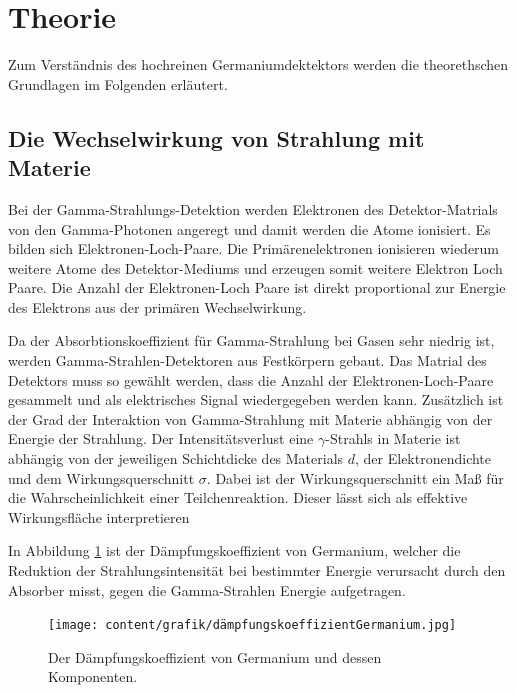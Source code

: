 \section[Theorie]{Theorie \textnormal{\cite{germanium}}}
\label{sec:theorie}

Zum Verständnis des hochreinen Germaniumdektektors werden die theorethschen Grundlagen im Folgenden erläutert.

\subsection{Die Wechselwirkung von Strahlung mit Materie}
\label{sec:WW mit Materie}

Bei der Gamma-Strahlungs-Detektion werden Elektronen des Detektor-Matrials von den Gamma-Photonen angeregt und damit werden die 
Atome ionisiert. Es bilden sich Elektronen-Loch-Paare. Die Primärenelektronen ionisieren wiederum weitere Atome des Detektor-Mediums und erzeugen somit weitere Elektron Loch Paare.
Die Anzahl der Elektronen-Loch Paare ist direkt proportional zur Energie des Elektrons aus der primären
Wechselwirkung.

Da der Absorbtionskoeffizient für Gamma-Strahlung bei Gasen sehr niedrig ist, 
werden Gamma-Strahlen-Detektoren aus Festkörpern gebaut. Das Matrial des Detektors muss so gewählt werden, dass
die Anzahl der Elektronen-Loch-Paare gesammelt und als elektrisches Signal wiedergegeben werden kann.
Zusätzlich ist der Grad der Interaktion von Gamma-Strahlung mit Materie abhängig von der Energie der Strahlung.
Der Intensitätsverlust  eine $\gamma$-Strahls in Materie ist abhängig von der jeweiligen Schichtdicke des Materials $d$,
der Elektronendichte und dem Wirkungsquerschnitt $\sigma$. Dabei ist der Wirkungsquerschnitt ein Maß für die Wahrscheinlichkeit einer Teilchenreaktion.
Dieser lässt sich als effektive Wirkungsfläche interpretieren

In Abbildung \ref{fig:koeffizient} ist der Dämpfungskoeffizient von Germanium, welcher die Reduktion der Strahlungsintensität
bei bestimmter Energie verursacht durch den Absorber misst, gegen die Gamma-Strahlen Energie aufgetragen.


\begin{figure}[H]
    \centering
    \texttt{[image: content/grafik/dämpfungskoeffizientGermanium.jpg]}
    \caption{Der Dämpfungskoeffizient von Germanium und dessen Komponenten. \cite{gamma_ray}}
    \label{fig:koeffizient}
\end{figure}

